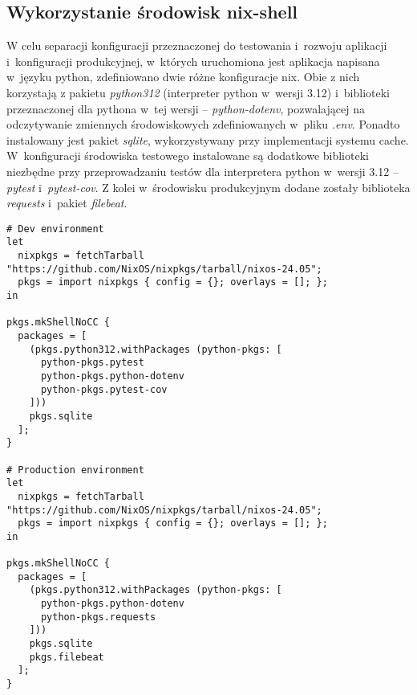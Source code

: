 \subsection{Wykorzystanie środowisk nix-shell}
W celu separacji konfiguracji przeznaczonej do testowania i~rozwoju aplikacji i~konfiguracji produkcyjnej, w~których uruchomiona jest aplikacja napisana w~języku python, zdefiniowano dwie różne konfiguracje nix. Obie z nich korzystają z pakietu \textit{python312} (interpreter python w~wersji 3.12) i~biblioteki przeznaczonej dla pythona w~tej wersji -- \textit{python-dotenv}, pozwalającej na odczytywanie zmiennych środowiskowych zdefiniowanych w~pliku \textit{.env}. Ponadto instalowany jest pakiet \textit{sqlite}, wykorzystywany przy implementacji systemu cache.
\newline \noindent W~konfiguracji środowiska testowego instalowane są dodatkowe biblioteki niezbędne przy przeprowadzaniu testów dla interpretera python w~wersji 3.12 -- \textit{pytest} i~\textit{pytest-cov}. Z kolei w~środowisku produkcyjnym dodane zostały biblioteka \textit{requests} i~pakiet \textit{filebeat}.
\begin{lstlisting}[caption = {Porównanie środowisk nix dla środowiska testowego i~środowiska produkcyjnego}]
# Dev environment
let
  nixpkgs = fetchTarball "https://github.com/NixOS/nixpkgs/tarball/nixos-24.05";
  pkgs = import nixpkgs { config = {}; overlays = []; };
in

pkgs.mkShellNoCC {
  packages = [
    (pkgs.python312.withPackages (python-pkgs: [
      python-pkgs.pytest
      python-pkgs.python-dotenv
      python-pkgs.pytest-cov
    ]))
    pkgs.sqlite
  ];
}

# Production environment
let
  nixpkgs = fetchTarball "https://github.com/NixOS/nixpkgs/tarball/nixos-24.05";
  pkgs = import nixpkgs { config = {}; overlays = []; };
in

pkgs.mkShellNoCC {
  packages = [
    (pkgs.python312.withPackages (python-pkgs: [
      python-pkgs.python-dotenv
      python-pkgs.requests
    ]))
    pkgs.sqlite
    pkgs.filebeat
  ];
}
\end{lstlisting}

